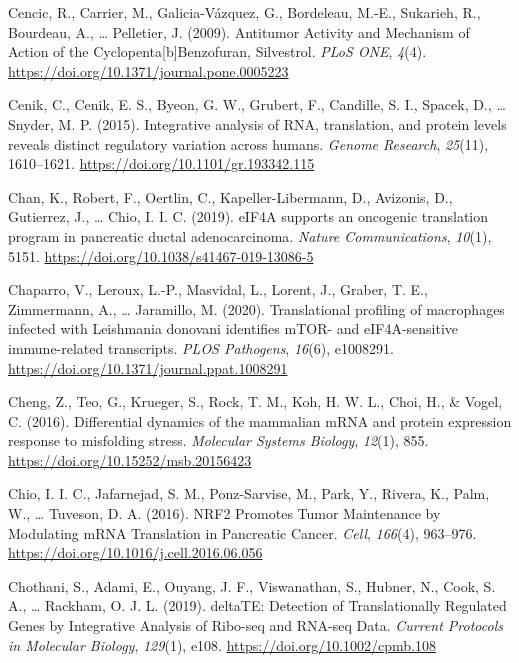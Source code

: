 \documentclass[12pt,openany]{book}
\begin{document}
\hypertarget{ref-Cencic2009}{}
Cencic, R., Carrier, M., Galicia-Vázquez, G., Bordeleau, M.-E.,
Sukarieh, R., Bourdeau, A., \ldots{} Pelletier, J. (2009). Antitumor
Activity and Mechanism of Action of the Cyclopenta{[}b{]}Benzofuran,
Silvestrol. \emph{PLoS ONE}, \emph{4}(4).
\url{https://doi.org/10.1371/journal.pone.0005223}

\hypertarget{ref-Cenik2015}{}
Cenik, C., Cenik, E. S., Byeon, G. W., Grubert, F., Candille, S. I.,
Spacek, D., \ldots{} Snyder, M. P. (2015). Integrative analysis of RNA,
translation, and protein levels reveals distinct regulatory variation
across humans. \emph{Genome Research}, \emph{25}(11), 1610--1621.
\url{https://doi.org/10.1101/gr.193342.115}

\hypertarget{ref-Chan2019}{}
Chan, K., Robert, F., Oertlin, C., Kapeller-Libermann, D., Avizonis, D.,
Gutierrez, J., \ldots{} Chio, I. I. C. (2019). eIF4A supports an
oncogenic translation program in pancreatic ductal adenocarcinoma.
\emph{Nature Communications}, \emph{10}(1), 5151.
\url{https://doi.org/10.1038/s41467-019-13086-5}

\hypertarget{ref-Chaparro2020}{}
Chaparro, V., Leroux, L.-P., Masvidal, L., Lorent, J., Graber, T. E.,
Zimmermann, A., \ldots{} Jaramillo, M. (2020). Translational profiling
of macrophages infected with Leishmania donovani identifies mTOR- and
eIF4A-sensitive immune-related transcripts. \emph{PLOS Pathogens},
\emph{16}(6), e1008291.
\url{https://doi.org/10.1371/journal.ppat.1008291}

\hypertarget{ref-Cheng2016}{}
Cheng, Z., Teo, G., Krueger, S., Rock, T. M., Koh, H. W. L., Choi, H.,
\& Vogel, C. (2016). Differential dynamics of the mammalian mRNA and
protein expression response to misfolding stress. \emph{Molecular
Systems Biology}, \emph{12}(1), 855.
\url{https://doi.org/10.15252/msb.20156423}

\hypertarget{ref-Chio2016}{}
Chio, I. I. C., Jafarnejad, S. M., Ponz-Sarvise, M., Park, Y., Rivera,
K., Palm, W., \ldots{} Tuveson, D. A. (2016). NRF2 Promotes Tumor
Maintenance by Modulating mRNA Translation in Pancreatic Cancer.
\emph{Cell}, \emph{166}(4), 963--976.
\url{https://doi.org/10.1016/j.cell.2016.06.056}

\hypertarget{ref-Chothani2019}{}
Chothani, S., Adami, E., Ouyang, J. F., Viswanathan, S., Hubner, N.,
Cook, S. A., \ldots{} Rackham, O. J. L. (2019). deltaTE: Detection of
Translationally Regulated Genes by Integrative Analysis of Ribo-seq and
RNA-seq Data. \emph{Current Protocols in Molecular Biology},
\emph{129}(1), e108. \url{https://doi.org/10.1002/cpmb.108}
\end{document}
